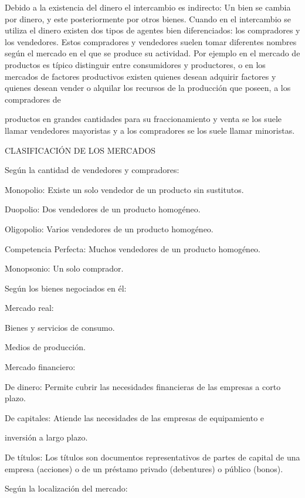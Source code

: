 Debido a la existencia del dinero el intercambio es indirecto: Un bien se cambia por dinero, y este posteriormente por otros bienes. Cuando en el intercambio se utiliza el dinero existen dos tipos de agentes bien diferenciados: los compradores y los vendedores. Estos compradores y vendedores suelen tomar diferentes nombres según el mercado en el que se produce su actividad. Por ejemplo en el mercado de productos es típico distinguir entre consumidores y productores, o en los mercados de factores productivos existen quienes desean adquirir factores y quienes desean vender o alquilar los recursos de la producción que poseen, a los compradores de



productos en grandes cantidades para su fraccionamiento y venta se los suele llamar vendedores mayoristas y a los compradores se los suele llamar minoristas.

CLASIFICACIÓN DE LOS MERCADOS

Según la cantidad de vendedores y compradores:

{\centering Monopolio: Existe un solo vendedor de un producto sin sustitutos.\par}

Duopolio: Dos vendedores de un producto homogéneo.

Oligopolio: Varios vendedores de un producto homogéneo.

{\centering Competencia Perfecta: Muchos vendedores de un producto homogéneo.\par}

Monopsonio: Un solo comprador.

Según los bienes negociados en él:

Mercado real:

Bienes y servicios de consumo.

Medios de producción.

Mercado financiero:

De dinero: Permite cubrir las necesidades financieras de las empresas a corto plazo.

{\centering De capitales: Atiende las necesidades de las empresas de equipamiento e\par}

inversión a largo plazo.

De títulos: Los títulos son documentos representativos de partes de capital de una empresa (acciones) o de un préstamo privado (debentures) o público (bonos).

Según la localización del mercado:

